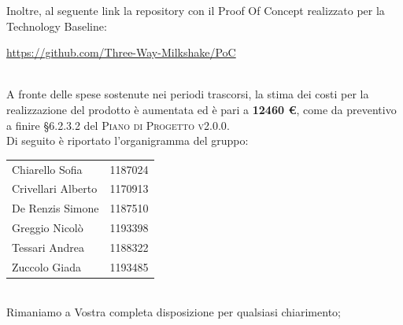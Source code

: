 \documentclass[10pt,stdletter,dateno,sigright]{newlfm}  %
\begin{document}
\begin{newlfm}
        Inoltre, al seguente link la repository con il Proof Of Concept realizzato per la Technology Baseline:
        \begin{center}
        	\url{https://github.com/Three-Way-Milkshake/PoC}
        \end{center}
        \ \\
        A fronte delle spese sostenute nei periodi trascorsi, la stima dei costi per la realizzazione del prodotto è aumentata ed è pari a \textbf{12460 \euro}, come da preventivo a finire \S 6.2.3.2 del \textsc{Piano di Progetto v2.0.0}.
        \\

        Di seguito \`e riportato l'organigramma del gruppo:
        \begin{center}
            \begin{tabular}{l | l}
                Chiarello Sofia & 1187024
                \\
                Crivellari Alberto & 1170913
                \\
                De Renzis Simone & 1187510
                \\
                Greggio Nicolò & 1193398
                \\
                Tessari Andrea & 1188322
                \\
                Zuccolo Giada & 1193485
                \\
            \end{tabular}
        \end{center}
        \ \newline
        \\Rimaniamo a Vostra completa disposizione per qualsiasi chiarimento;

    \end{newlfm}
\end{document}
